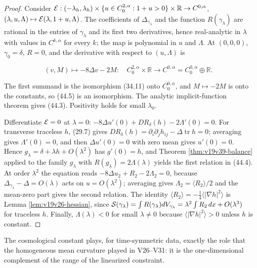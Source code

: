 \documentclass[11pt]{article}
\theoremstyle{remark}
\begin{document}
\begin{proof}
Consider
\({\cal E}:(-\lambda_h,\lambda_h)\times\{u\in C^{2,\alpha}_0:1+u>0\}\times\mathbb R
\to C^{0,\alpha}\), \((\lambda,u,\Lambda)\mapsto{\cal E}(\lambda,1+u,\Lambda)\).
The coefficients of \(\Delta_{\gamma_\lambda}\) and the function
\(R(\gamma_\lambda)\) are rational in the entries of \(\gamma_\lambda\)
and its first two derivatives, hence real-analytic in \(\lambda\) with
values in \(C^{k,\alpha}\) for every \(k\); the map is polynomial in
\(u\) and \(\Lambda\).  At \((0,0,0)\), \(\gamma_0=\delta\), \(R=0\), and
the derivative with respect to \((u,\Lambda)\) is

\[
 (v,M)\longmapsto-8\Delta v-2M:\quad
 C^{2,\alpha}_0\times\mathbb R\to C^{0,\alpha}=C^{0,\alpha}_0\oplus\mathbb R.
                                                                    \tag{44.5}
\]

The first summand is the isomorphism (34.11) onto \(C^{0,\alpha}_0\),
and \(M\mapsto-2M\) is onto the constants, so (44.5) is an
isomorphism.  The analytic implicit-function theorem gives (44.3).
Positivity holds for small \(\lambda_0\).

Differentiate \({\cal E}=0\) at \(\lambda=0\):
\(-8\Delta u'(0)+DR_\delta(h)-2\Lambda'(0)=0\).  For transverse
traceless \(h\), (29.7) gives \(DR_\delta(h)=\partial_i\partial_jh_{ij}-\Delta\operatorname{tr}h=0\);
averaging gives \(\Lambda'(0)=0\), and then \(\Delta u'(0)=0\) with zero
mean gives \(u'(0)=0\).  Hence \(g_\lambda=\delta+\lambda h+O(\lambda^2)\)
has \(g'(0)=h\), and Theorem \ref{thm:v19v39-balance} applied to the
family \(g_\lambda\) with \(R(g_\lambda)=2\Lambda(\lambda)\) yields the
first relation in (44.4).  At order \(\lambda^2\) the equation reads
\(-8\Delta u_2+R_2-2\Lambda_2=0\), because \(\Delta_{\gamma_\lambda}-\Delta=O(\lambda)\)
acts on \(u=O(\lambda^2)\); averaging gives \(\Lambda_2=\langle R_2\rangle/2\)
and the mean-zero part gives the second relation.  The identity
\(\langle R_2\rangle=-\tfrac14\langle|\nabla h|^2\rangle\) is Lemma
\ref{lem:v19v26-hessian}, since
\({\cal S}(\gamma_\lambda)=\int R(\gamma_\lambda)dV_{\gamma_\lambda}
=\lambda^2\int R_2\,dx+O(\lambda^3)\) for traceless \(h\).  Finally,
\(\Lambda(\lambda)<0\) for small \(\lambda\neq0\) because
\(\langle|\nabla h|^2\rangle>0\) unless \(h\) is constant.
\end{proof}

The cosmological constant plays, for time-symmetric data, exactly the
role that the homogeneous mean curvature played in V26--V31: it is the
one-dimensional complement of the range of the linearized constraint.
\end{document}
